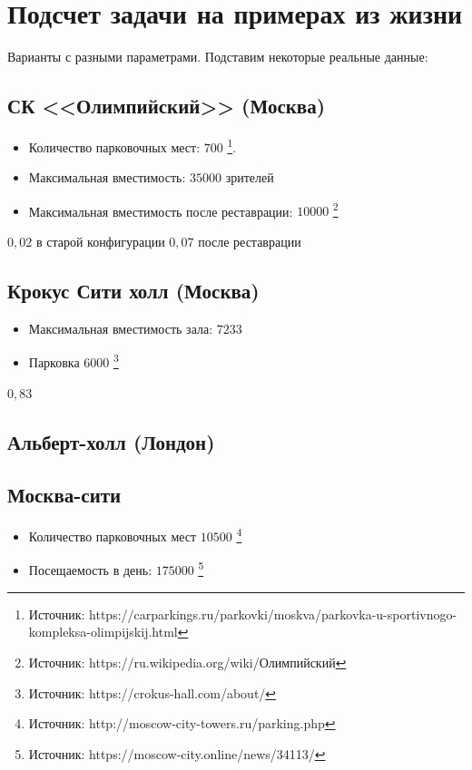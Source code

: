 \section{Подсчет задачи на примерах из жизни}\label{examples}

Варианты с разными параметрами. Подставим некоторые реальные данные:

\subsection{СК <<Олимпийский>> (Москва)}

\begin{itemize}
	\item Количество парковочных мест: $700$ \footnote{Источник: https://carparkings.ru/parkovki/moskva/parkovka-u-sportivnogo-kompleksa-olimpijskij.html}.
	\item Максимальная вместимость: $35 000$ зрителей
	\item Максимальная вместимость после реставрации: $10 000$ \footnote{Источник: https://ru.wikipedia.org/wiki/Олимпийский}
\end{itemize}
$0,02$ в старой конфигурации
$0,07$ после реставрации

\subsection{Крокус Сити холл (Москва)}
\begin{itemize}
	\item Максимальная вместимость зала: $7233$
	\item Парковка $6000$ \footnote{Источник: https://crokus-hall.com/about/}
\end{itemize}

$0,83$

\subsection{Альберт-холл (Лондон)}

\subsection{Москва-сити}
\begin{itemize}
	\item Количество парковочных мест $10 500$  \footnote{Источник: http://moscow-city-towers.ru/parking.php}
	\item Посещаемость в день:  $175 000$ \footnote{Источник: https://moscow-city.online/news/34113/}
\end{itemize}

